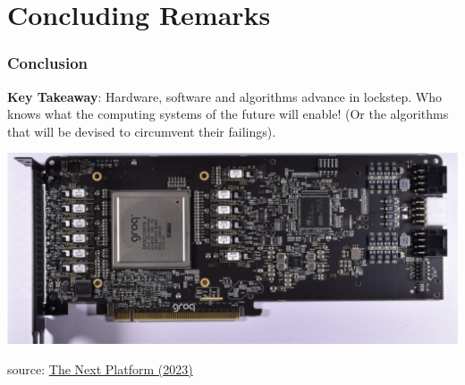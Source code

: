 \section{Concluding Remarks}

\begin{frame}
    \frametitle{Conclusion}

    \textbf{Key Takeaway}: Hardware, software and algorithms advance in lockstep. Who knows what the computing systems of the future will enable! (Or the algorithms that will be devised to circumvent their failings).

    \includegraphics[width=\linewidth]{assets/groq.jpeg}

    source: \href{https://www.nextplatform.com/2023/11/27/groq-says-it-can-deploy-1-million-ai-inference-chips-in-two-years/}{The Next Platform (2023)}

\end{frame}